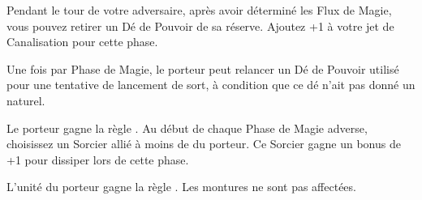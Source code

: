 \columnbreak
\armyarcaneitems

\startpricelist

Pendant le tour de votre adversaire, après avoir déterminé les Flux de Magie, vous pouvez retirer un Dé de Pouvoir de sa réserve. Ajoutez +1 à votre jet de Canalisation pour cette phase.

Une fois par Phase de Magie, le porteur peut relancer un Dé de Pouvoir utilisé pour une tentative de lancement de sort, à condition que ce dé n'ait pas donné un  naturel.

\endpricelist

\armymagicalbanners

\startpricelist

Le porteur gagne la règle \channel{}. Au début de chaque Phase de Magie adverse, choisissez un Sorcier allié à moins de  du porteur. Ce Sorcier gagne un bonus de +1 pour dissiper lors de cette phase.

L'unité du porteur gagne la règle \thunderouscharge{}. Les montures ne sont pas affectées.

\endpricelist

\closearmymagicalitems








\quickrefsheettitle

